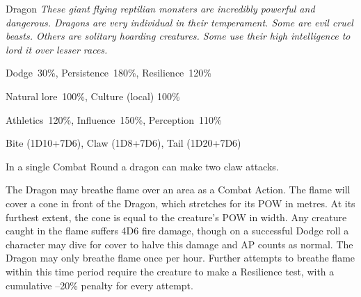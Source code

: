\begin{monsterbox}{Dragon}
	\textit{These giant flying reptilian monsters are incredibly powerful and dangerous. Dragons are very individual in their temperament. Some are evil cruel beasts. Others are solitary hoarding creatures. Some use their high intelligence to lord it over lesser races.}\\
	\rpghline
	\basics[%
        hitpoints  = 50, %
	majorwound = 25,
	damagemodifier = +7D6,
	powerpoints = 26,
	movementrate = {30m, 45m when flying},
	armor = Dragon Scales (12AP),
	plunderrating = 5-6
	]
	\rpghline%
	\stats[ %
		STR = 20D6    (70),
		CON = 10D6    (35),
		DEX = 4D6     (14),
		SIZ = 10D6+30 (65),
		INT = 6D6     (21),
		POW = 4D6+12  (26),
		CHA = 6D6     (21)
	]
	\rpghline%
	\begin{rpg-monsteraction}[Resistances]
		Dodge~30\%, Persistence~180\%, Resilience~120\%
	\end{rpg-monsteraction}
	\begin{rpg-monsteraction}[Knowledge]
		Natural lore~100\%, Culture (local) 100\%
	\end{rpg-monsteraction}
	\begin{rpg-monsteraction}[Practical]
		Athletics~120\%, Influence~150\%, Perception~110\%
	\end{rpg-monsteraction}
	\begin{rpg-monsteraction}
		Bite (1D10+7D6), Claw (1D8+7D6), Tail (1D20+7D6)
	\end{rpg-monsteraction}
	\begin{rpg-monsteraction}
		In a single Combat Round a dragon can make two claw attacks.
	\end{rpg-monsteraction}
	\begin{rpg-monsteraction}
		The Dragon may breathe flame over an area as a Combat Action. The flame will cover a cone in front of the Dragon, which stretches for its POW in metres. At its furthest extent, the cone is equal to the creature’s POW in width.
		Any creature caught in the flame suffers 4D6 fire damage, though on a successful Dodge roll a character may dive for cover to halve this damage and AP counts as normal.
		The Dragon may only breathe flame once per hour. Further attempts to breathe flame within this time period require the creature to make a Resilience test, with a cumulative –20\% penalty for every attempt.

\end{rpg-monsteraction}
\end{monsterbox}
